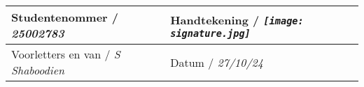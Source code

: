 \vfill

\noindent \begin{tabularx}{1.0\linewidth}{|L|L|}
    \hline
    \vspace{1cm} {Studentenommer / \textit{25002783}} & \vspace{1cm} {Handtekening / \textit{\texttt{[image: signature.jpg]}}} \\
    \hline
    \vspace{1cm} {Voorletters en van / \textit{S Shaboodien}} & \vspace{1cm} {Datum / \textit{27/10/24}} \\
    \hline
\end{tabularx}

\vspace{15pt}


%
%
%
%
%

